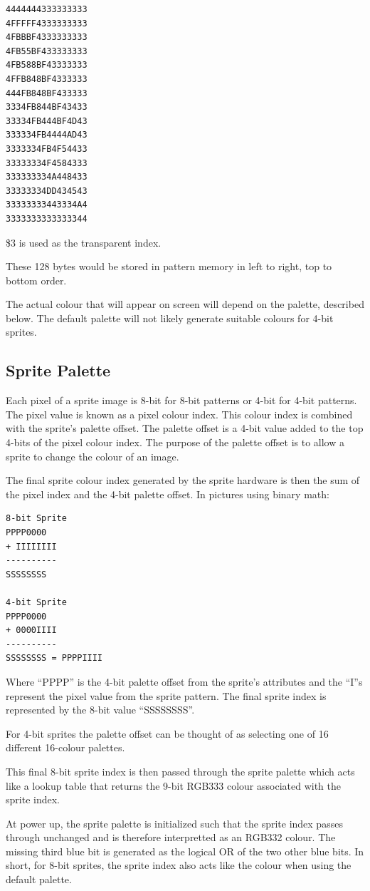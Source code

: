 \begin{verbatim}
4444444333333333
4FFFFF4333333333
4FBBBF4333333333
4FB55BF433333333
4FB588BF43333333
4FFB848BF4333333
444FB848BF433333
3334FB844BF43433
33334FB444BF4D43
333334FB4444AD43
3333334FB4F54433
33333334F4584333
333333334A448433
33333334DD434543
33333333443334A4
3333333333333344
\end{verbatim}

\$3 is used as the transparent index.

These 128 bytes would be stored in pattern memory in left to right,
top to bottom order.

The actual colour that will appear on screen will depend on the
palette, described below. The default palette will not likely generate
suitable colours for 4-bit sprites.

\subsection{Sprite Palette}
Each pixel of a sprite image is 8-bit for 8-bit patterns or 4-bit for
4-bit patterns. The pixel value is known as a pixel colour index. This
colour index is combined with the sprite’s palette offset. The palette
offset is a 4-bit value added to the top 4-bits of the pixel colour
index. The purpose of the palette offset is to allow a sprite to
change the colour of an image.

The final sprite colour index generated by the sprite hardware is then
the sum of the pixel index and the 4-bit palette offset. In pictures
using binary math:

\begin{verbatim}
8-bit Sprite
PPPP0000
+ IIIIIIII
----------
SSSSSSSS

4-bit Sprite
PPPP0000
+ 0000IIII
----------
SSSSSSSS = PPPPIIII
\end{verbatim}

Where “PPPP” is the 4-bit palette offset from the sprite’s attributes
and the “I”s represent the pixel value from the sprite pattern. The
final sprite index is represented by the 8-bit value “SSSSSSSS”.

For 4-bit sprites the palette offset can be thought of as selecting
one of 16 different 16-colour palettes.

This final 8-bit sprite index is then passed through the sprite
palette which acts like a lookup table that returns the 9-bit RGB333
colour associated with the sprite index.

At power up, the sprite palette is initialized such that the sprite
index passes through unchanged and is therefore interpretted as an
RGB332 colour. The missing third blue bit is generated as the logical
OR of the two other blue bits. In short, for 8-bit sprites, the sprite
index also acts like the colour when using the default palette.

